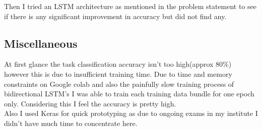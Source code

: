 \documentclass{article}
\begin{document}
Then I tried an LSTM architecture as mentioned in the problem statement to see if there is any significant improvement in accuracy but did not find any.

\subsection*{Miscellaneous}
At first glance the task classification accuracy isn't too high(approx 80\%) however this is due to insufficient training time.
Due to time and memory constraints on Google colab and also the painfully slow training process of bidirectional LSTM's I was able to train each training data bundle for one epoch only. Considering this I feel the accuracy is pretty high.
\\
Also I used Keras for quick prototyping as due to ongoing exams in my institute I didn't have much time to concentrate here.
\end{document}
